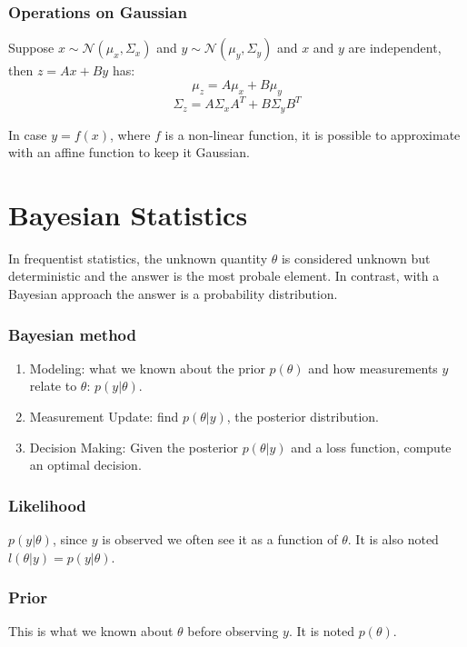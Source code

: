 \subsubsection{Operations on Gaussian}
Suppose $x \sim \mathcal{N}(\mu_x, \Sigma_x)$ and $y \sim \mathcal{N}(\mu_y, \Sigma_y)$ and $x$ and $y$ are independent, then $z = Ax+By$ has:
\begin{equation}
    \mu_z = A\mu_x + B\mu_y
\end{equation}
\begin{equation}
    \Sigma_z = A \Sigma_x A^T + B \Sigma_y B^T
\end{equation}

In case $y=f(x)$, where $f$ is a non-linear function, it is possible to approximate with an affine function to keep it Gaussian.

\section{Bayesian Statistics}
In frequentist statistics, the unknown quantity $\theta$ is considered unknown but deterministic and the answer is the most probale element. In contrast, with a Bayesian approach the answer is a probability distribution.
\subsubsection{Bayesian method}
\begin{enumerate}
    \item Modeling: what we known about the prior $p(\theta)$ and how measurements $y$ relate to $\theta$: $p(y|\theta)$.
    \item Measurement Update: find $p(\theta|y)$, the posterior distribution.
    \item Decision Making: Given the posterior $p(\theta|y)$ and a loss function, compute an optimal decision.
\end{enumerate}

\subsubsection{Likelihood}
$p(y|\theta)$, since $y$ is observed we often see it as a function of $\theta$. It is also noted $l(\theta|y) = p(y|\theta)$.

\subsubsection{Prior} This is what we known about $\theta$ before observing $y$. It is noted $p(\theta)$.

